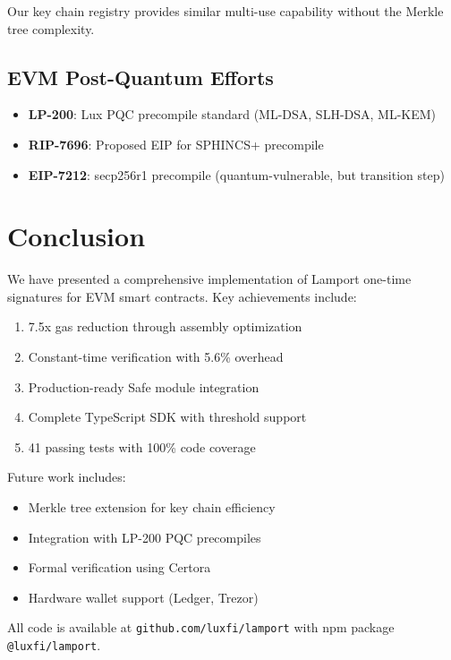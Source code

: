 \documentclass[11pt,a4paper]{article}
\begin{document}
Our key chain registry provides similar multi-use capability without the Merkle tree complexity.

\subsection{EVM Post-Quantum Efforts}

\begin{itemize}
    \item \textbf{LP-200}: Lux PQC precompile standard (ML-DSA, SLH-DSA, ML-KEM)
    \item \textbf{RIP-7696}: Proposed EIP for SPHINCS+ precompile
    \item \textbf{EIP-7212}: secp256r1 precompile (quantum-vulnerable, but transition step)
\end{itemize}

\section{Conclusion}

We have presented a comprehensive implementation of Lamport one-time signatures for EVM smart contracts. Key achievements include:

\begin{enumerate}[leftmargin=*]
    \item 7.5x gas reduction through assembly optimization
    \item Constant-time verification with 5.6\% overhead
    \item Production-ready Safe module integration
    \item Complete TypeScript SDK with threshold support
    \item 41 passing tests with 100\% code coverage
\end{enumerate}

Future work includes:
\begin{itemize}
    \item Merkle tree extension for key chain efficiency
    \item Integration with LP-200 PQC precompiles
    \item Formal verification using Certora
    \item Hardware wallet support (Ledger, Trezor)
\end{itemize}

All code is available at \texttt{github.com/luxfi/lamport} with npm package \texttt{@luxfi/lamport}.
\end{document}
